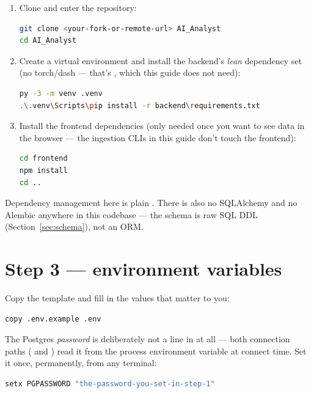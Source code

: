 \documentclass[11pt]{article}
\begin{document}
\begin{enumerate}
  \item Clone and enter the repository:
\begin{lstlisting}[language=bash]
git clone <your-fork-or-remote-url> AI_Analyst
cd AI_Analyst
\end{lstlisting}
  \item Create a virtual environment and install the backend's \emph{lean} dependency
        set (no torch/dash --- that's , which this guide
        does not need):
\begin{lstlisting}[language=bash]
py -3 -m venv .venv
.\.venv\Scripts\pip install -r backend\requirements.txt
\end{lstlisting}
  \item Install the frontend dependencies (only needed once you want to see data in the
        browser --- the ingestion CLIs in this guide don't touch the frontend):
\begin{lstlisting}[language=bash]
cd frontend
npm install
cd ..
\end{lstlisting}
\end{enumerate}

\begin{notebox}
Dependency management here is plain . There is
also no SQLAlchemy and no Alembic anywhere in this codebase --- the schema is raw SQL
DDL (Section~\ref{sec:schema}), not an ORM.
\end{notebox}

\section{Step 3 --- environment variables}

Copy the template and fill in the values that matter to you:

\begin{lstlisting}[language=bash]
copy .env.example .env
\end{lstlisting}

The Postgres \emph{password} is deliberately not a line in  at all --- both
connection paths ( and ) read it from the 
process environment variable at connect time. Set it once, permanently, from any
terminal:

\begin{lstlisting}[language=bash]
setx PGPASSWORD "the-password-you-set-in-step-1"
\end{lstlisting}
\end{document}
